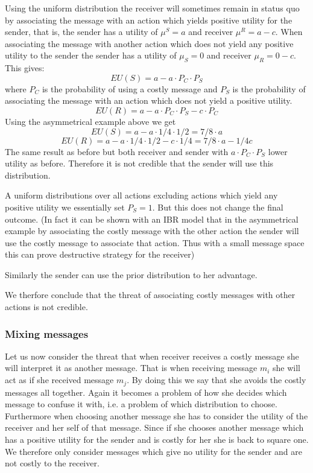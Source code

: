 \documentclass[10]{article}
\begin{document}
Using the uniform distribution the receiver will sometimes remain in status quo by associating the message with an action which yields positive utility for the sender, that is, the sender has a utility of $\mu^S=a$ and receiver $\mu^R=a-c$. When associating the message with another action which does not yield any positive utility to the sender the sender has a utility of $\mu_S=0$ and receiver $\mu_R=0-c$. %
This gives:
$$EU(S)=a-a \cdot P_C \cdot P_S$$
 where $P_C$ is the probability of using a costly message and $P_S$ is the probability of associating the message with an action which does not yield a positive utility.
 $$EU(R)=a-a \cdot P_C \cdot P_S - c \cdot P_C$$
 Using the asymmetrical example above we get
 $$EU(S)=a-a \cdot 1/4 \cdot 1/2=7/8 \cdot a$$
 $$EU(R)=a-a \cdot 1/4 \cdot 1/2 - c \cdot 1/4=7/8 \cdot a - 1/4c$$
 The same result as before but both receiver and sender with $a \cdot P_C \cdot P_S$ lower utility as before. Therefore it is not credible that the sender will use this distribution.

A uniform distributions over all actions excluding actions which yield any positive utility we essentially set $P_S=1$. But this does not change the final outcome. (In fact it can be shown with an IBR model that in the asymmetrical example by associating the costly message with the other action the sender will use the costly message to associate that action. Thus with a small message space this can prove destructive strategy for the receiver)

Similarly the sender can use the prior distribution to her advantage.

We therfore conclude that the threat of associating costly messages with other actions is not credible.

\subsubsection{Mixing messages}
Let us now consider the threat that when receiver receives a costly message she will interpret it as another message. %
That is when receiving message $m_i$ she will act as if she received message $m_j$. By doing this we say that she avoids the costly messages all together. Again it becomes a problem of how she decides which message to confuse it with, i.e. a problem of which distribution to choose. Furthermore when choosing another message she has to consider the utility of the receiver and her self of that message. Since if she chooses another message which has a positive utility for the sender and is costly for her she is back to square one. We therefore only consider messages which give no utility for the sender and are not costly to the receiver.
\end{document}
